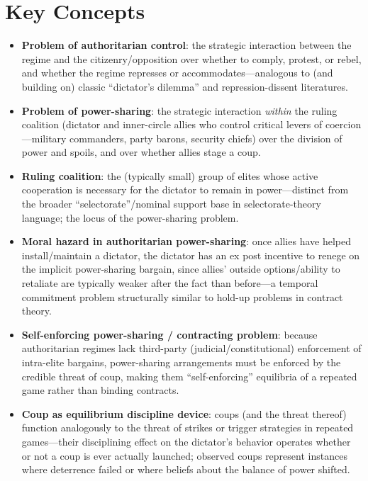 \documentclass[12pt]{article}
\begin{document}
\section{Key Concepts}

\begin{itemize}[leftmargin=*, itemsep=4pt]
    \item \textbf{Problem of authoritarian control}: the strategic interaction between the regime and the citizenry/opposition over whether to comply, protest, or rebel, and whether the regime represses or accommodates---analogous to (and building on) classic ``dictator's dilemma'' and repression-dissent literatures.
    \item \textbf{Problem of power-sharing}: the strategic interaction \emph{within} the ruling coalition (dictator and inner-circle allies who control critical levers of coercion---military commanders, party barons, security chiefs) over the division of power and spoils, and over whether allies stage a coup.
    \item \textbf{Ruling coalition}: the (typically small) group of elites whose active cooperation is necessary for the dictator to remain in power---distinct from the broader ``selectorate''/nominal support base in selectorate-theory language; the locus of the power-sharing problem.
    \item \textbf{Moral hazard in authoritarian power-sharing}: once allies have helped install/maintain a dictator, the dictator has an ex post incentive to renege on the implicit power-sharing bargain, since allies' outside options/ability to retaliate are typically weaker after the fact than before---a temporal commitment problem structurally similar to hold-up problems in contract theory.
    \item \textbf{Self-enforcing power-sharing / contracting problem}: because authoritarian regimes lack third-party (judicial/constitutional) enforcement of intra-elite bargains, power-sharing arrangements must be enforced by the credible threat of coup, making them ``self-enforcing'' equilibria of a repeated game rather than binding contracts.
    \item \textbf{Coup as equilibrium discipline device}: coups (and the threat thereof) function analogously to the threat of strikes or trigger strategies in repeated games---their disciplining effect on the dictator's behavior operates whether or not a coup is ever actually launched; observed coups represent instances where deterrence failed or where beliefs about the balance of power shifted.

\end{itemize}
\end{document}
